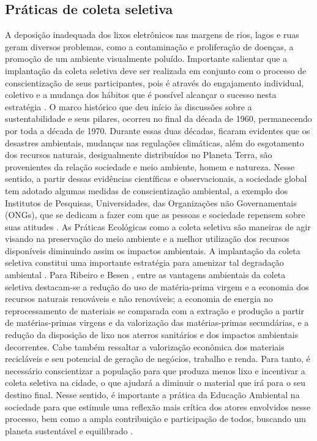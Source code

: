 \documentclass[
	12pt,				%
	openany,			%
	twoside,			%
	a4paper,			%
	english,			%
	french,				%
	spanish,			%
	brazil				%
	]{abntex2}
\begin{document}
\subsection{Práticas de coleta seletiva}
A deposição inadequada dos lixos eletrônicos nas margens de rios, lagos e ruas geram diversos problemas, como a contaminação e proliferação de doenças, a promoção de um ambiente visualmente poluído. Importante salientar que a implantação da coleta seletiva deve ser realizada em conjunto com o processo de conscientização de seus participantes, pois é através do engajamento individual, coletivo e a mudança dos hábitos que é possível alcançar o sucesso nesta estratégia \cite{jkmnusc}. 
O marco histórico que deu início às discussões sobre a sustentabilidade e seus pilares, ocorreu no final da década de 1960, permanecendo por toda a década de 1970. Durante essas duas décadas, ficaram evidentes que os desastres ambientais, mudanças nas regulações climáticas, além do esgotamento dos recursos naturais, desigualmente distribuídos no Planeta Terra, são provenientes da relação sociedade e meio ambiente, homem e natureza.  Nesse sentido, a partir dessas evidências científicas e observacionais, a sociedade global tem adotado algumas medidas de conscientização ambiental, a exemplo dos Institutos de Pesquisas, Universidades, das Organizações não Governamentais (ONGs), que se dedicam a fazer com que as pessoas e sociedade repensem sobre suas atitudes \cite{phsr}. 
As Práticas Ecológicas como a coleta seletiva são maneiras de agir visando na preservação do meio ambiente e a melhor utilização dos recursos disponíveis diminuindo assim os impactos ambientais.  A implantação da coleta seletiva constitui uma importante estratégia para amenizar tal degradação ambiental \cite{vos}. 
Para Ribeiro e Besen \cite{grbhr} , entre as vantagens ambientais da coleta seletiva destacam-se a redução do uso de matéria-prima virgem e a economia dos recursos naturais renováveis e não renováveis; a economia de energia no reprocessamento de materiais se comparada com a extração e produção a partir de matérias-primas virgens e da valorização das matérias-primas secundárias, e a redução da disposição de lixo nos aterros sanitários e dos impactos ambientais decorrentes. Cabe também ressaltar a valorização econômica dos materiais recicláveis e seu potencial de geração de negócios, trabalho e renda.
Para tanto, é necessário conscientizar a população para que produza menos lixo e incentivar a coleta seletiva na cidade, o que ajudará a diminuir o material que irá para o seu destino final. Nesse sentido, é importante a prática da Educação Ambiental na sociedade para que estimule uma reflexão mais crítica dos atores envolvidos nesse processo, bem como a ampla contribuição e participação de todos, buscando um planeta sustentável e equilibrado \cite{srvct}. 
\end{document}
